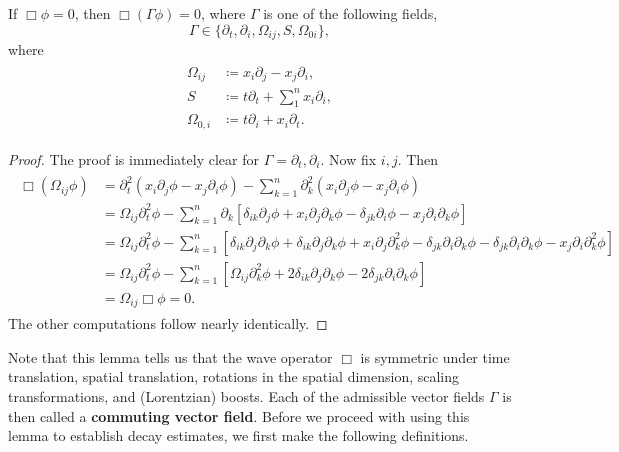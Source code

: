 \documentclass{article}
\begin{document}
\begin{lemma}
	If $\Box\phi = 0$, then $\Box(\Gamma\phi) = 0$, where $\Gamma$ is one of the following fields, 
	\begin{equation*}
		\Gamma \in \{\partial_{t}, \partial_{i}, \Omega_{ij}, S, \Omega_{0i}\}, 
	\end{equation*} 
	where 
	\begin{align*}
		\begin{split} 
			\Omega_{ij} &\coloneqq x_{i}\partial_{j} - x_{j}\partial_{i}, \\
			S &\coloneqq t\partial_{t}+ \sum_{1}^{n}x_{i}\partial_{i}, \\
			\Omega_{0,i} &\coloneqq t\partial_{i} + x_{i}\partial_{t}. 
		\end{split} 
	\end{align*} 
	\label{eq:invarianceUnderCommutingFields}
\end{lemma} 
\begin{proof}
	The proof is immediately clear for $\Gamma = \partial_{t}, \partial_{i}$. Now fix $i, j$. Then 
	\begin{align*}
		\begin{split}
			\Box(\Omega_{ij}\phi) &= \partial_{t}^{2}(x_{i}\partial_{j}\phi - x_{j}\partial_{i}\phi) - \sum_{k = 1}^{n}\partial_{k}^{2}(x_{i}\partial_{j}\phi - x_{j}\partial_{i}\phi)  \\
			&= \Omega_{ij}\partial_{t}^{2}\phi - \sum_{k = 1}^{n}\partial_{k}\left[\delta_{ik}\partial_{j}\phi + x_{i}\partial_{j}\partial_{k}\phi - \delta_{jk}\partial_{i}\phi - x_{j}\partial_{i}\partial_{k}\phi\right] \\
			&= \Omega_{ij}\partial_{t}^{2}\phi - \sum_{k = 1}^{n}\left[\delta_{ik}\partial_{j}\partial_{k}\phi + \delta_{ik} \partial_{j}\partial_{k}\phi + x_{i}\partial_{j}\partial_{k}^{2}\phi - \delta_{jk}\partial_{i}\partial_{k}\phi - \delta_{jk}\partial_{i}\partial_{k}\phi -x_{j}\partial_{i}\partial_{k}^{2}\phi\right] \\
			&= \Omega_{ij}\partial_{t}^{2}\phi - \sum_{k = 1}^{n}\left[\Omega_{ij}\partial_{k}^{2}\phi + 2\delta_{ik}\partial_{j}\partial_{k}\phi -2\delta_{jk}\partial_{i}\partial_{k}\phi \right] \\
			&= \Omega_{ij}\Box\phi = 0. 
		\end{split} 
	\end{align*} 
	The other computations follow nearly identically. 
\end{proof} 
Note that this lemma tells us that the wave operator $\Box$ is symmetric under time translation, spatial translation, rotations in the spatial dimension, scaling transformations, and (Lorentzian) boosts. Each of the admissible vector fields $\Gamma$ is then called a \textbf{commuting vector field}. Before we proceed with using this lemma to establish decay estimates, we first make the following definitions. 
\end{document}
